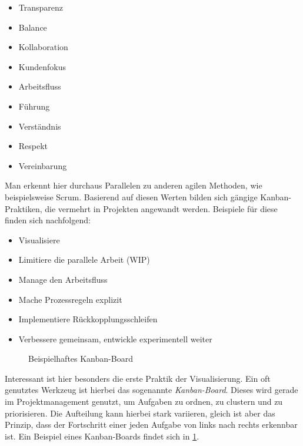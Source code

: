\begin{itemize}[noitemsep, topsep=0pt]
	\item Transparenz
	\item Balance
	\item Kollaboration
	\item Kundenfokus
	\item Arbeitsfluss
	\item Führung
	\item Verständnis
	\item Respekt
	\item Vereinbarung
\end{itemize}

Man erkennt hier durchaus Parallelen zu anderen agilen Methoden, wie beispielsweise Scrum. Basierend auf diesen Werten bilden sich gängige Kanban-Praktiken, die vermehrt in Projekten angewandt werden. Beispiele für diese finden sich nachfolgend:

\begin{itemize}[noitemsep, topsep=0pt]
	\item Visualisiere
	\item Limitiere die parallele Arbeit (WIP)
	\item Manage den Arbeitsfluss
	\item Mache Prozessregeln explizit
	\item Implementiere Rückkopplungsschleifen
	\item Verbessere gemeinsam, entwickle experimentell weiter
\end{itemize}

\begin{figure}[H]
	\centering
	\caption[Beispielhaftes Kanban-Board]{Beispielhaftes Kanban-Board \protect \cite[S. 15]{anderson_essenz_2018}}
	\label{fig:kanban}
\end{figure}

Interessant ist hier besonders die erste Praktik der Visualisierung. Ein oft genutztes Werkzeug ist hierbei das sogenannte \textit{Kanban-Board}. Dieses wird gerade im Projektmanagement genutzt, um Aufgaben zu ordnen, zu clustern und zu priorisieren. Die Aufteilung kann hierbei stark variieren, gleich ist aber das Prinzip, dass der Fortschritt einer jeden Aufgabe von links nach rechts erkennbar ist. \cite[S. 21]{anderson_essenz_2018} Ein Beispiel eines Kanban-Boards findet sich in \ref{fig:kanban}.

